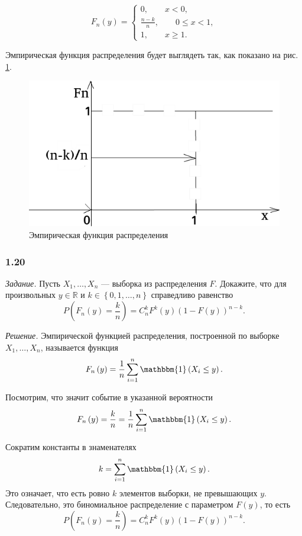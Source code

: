 $$F_n \left( y \right) =
  \begin{cases}
    0, \qquad x < 0, \\
    \frac{n - k}{n}, \qquad 0 \leq x < 1, \\
    1, \qquad x \geq 1.
  \end{cases}$$

Эмпирическая функция распределения будет выглядеть так, как показано на рис. \ref{fig:119}.

\begin{figure}[h!]
  \centering
  \includegraphics[width=.4\textwidth]{./pictures/1_19.png}
  \caption{Эмпирическая функция распределения}
  \label{fig:119}
\end{figure}

\subsubsection*{1.20}

\textit{Задание.} Пусть $X_1, \dotsc, X_n$ --- выборка из распределения $F$.
Докажите,
что для произвольных $y \in \mathbb{R}$ и $k \in \left\{ 0, 1, \dotsc, n \right\} $
справедливо равенство
$$P \left( F_n \left( y \right) = \frac{k}{n} \right) =
  C_n^k F^k \left( y \right) \left( 1 - F \left( y \right) \right)^{n - k}.$$

\textit{Решение.} Эмпирической функцией распределения, построенной по выборке $X_1, \dotsc, X_n$,
называется функция
$$F_n \left( y \right) =
  \frac{1}{n} \sum \limits_{i = 1}^n \mathbbm{1} \left( X_i \leq y \right).$$

Посмотрим, что значит событие в указанной вероятности
$$F_n \left( y \right) =
  \frac{k}{n} =
  \frac{1}{n} \sum \limits_{i = 1}^n \mathbbm{1} \left( X_i \leq y \right).$$

Сократим константы в знаменателях
$$k =
  \sum \limits_{i = 1}^n \mathbbm{1} \left( X_i \leq y \right).$$
Это означает, что есть ровно $k$ элементов выборки, не превышающих $y$.
Следовательно, это биномиальное распределение с параметром $F \left( y \right) $, то есть
$$P \left( F_n \left( y \right) = \frac{k}{n} \right) =
  C_n^k F^k \left( y \right) \left( 1 - F \left( y \right) \right)^{n - k}.$$
